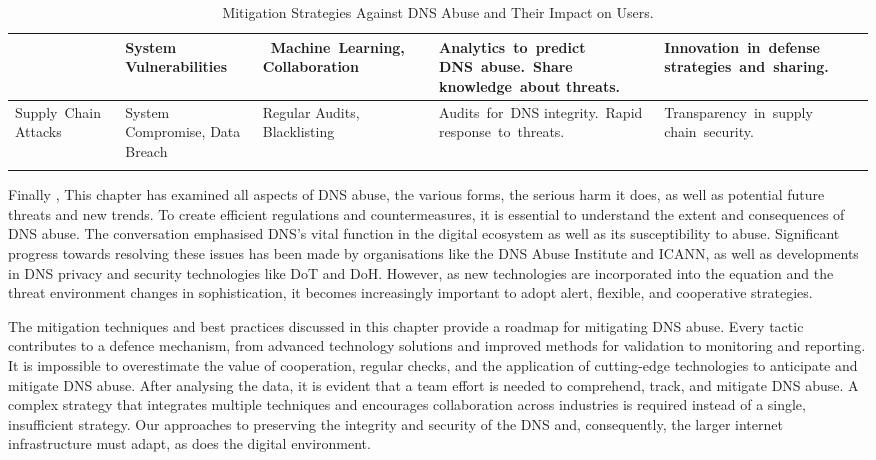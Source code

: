 {\begin{longtable}{|p{2.5cm}|p{2.5cm}|p{4cm}|p{3cm}|p{4cm}|}
{\mbox{Exploiting} Emerging \mbox{Technologies} & System \mbox{Vulnerabilities} &\mbox{ Machine Learning,} \mbox{Collaboration} & \mbox{Analytics to predict} \mbox{DNS abuse. Share} \mbox{knowledge about} \mbox{threats.} & \mbox{Innovation in defense}  \mbox{strategies and sharing.} \\ \hline

\mbox{Supply Chain} \mbox{Attacks} & \mbox{System} \mbox{Compromise,} Data Breach & Regular Audits, Blacklisting & \mbox{Audits for DNS} \mbox{integrity. Rapid} \mbox{response to threats.} & \mbox{Transparency in supply} \mbox{chain security.} \\ \hline

\caption{Mitigation Strategies Against DNS Abuse and Their Impact on Users.} 

\end{longtable}

}

Finally , This chapter has examined all aspects of DNS abuse,  the various forms, the serious harm it does, as well as potential future threats and new trends. To create efficient regulations and countermeasures, it is essential to understand the extent and consequences of DNS abuse. The conversation emphasised DNS's vital function in the digital ecosystem as well as its susceptibility to abuse. Significant progress towards resolving these issues has been made by organisations like the DNS Abuse Institute and ICANN, as well as developments in DNS privacy and security technologies like DoT and DoH. However, as new technologies are incorporated into the equation and the threat environment changes in sophistication, it becomes increasingly important to adopt alert, flexible, and cooperative strategies.  

The mitigation techniques and best practices discussed in this chapter provide a roadmap for mitigating DNS abuse. Every tactic contributes to a defence mechanism, from advanced technology solutions and improved methods for validation to monitoring and reporting. It is impossible to overestimate the value of cooperation, regular checks, and the application of cutting-edge technologies to anticipate and mitigate DNS abuse. After analysing the data, it is evident that a team effort is needed to comprehend, track, and mitigate DNS abuse. A complex strategy that integrates multiple techniques and encourages collaboration across industries is required instead of a single, insufficient strategy. Our approaches to preserving the integrity and security of the DNS and, consequently, the larger internet infrastructure must adapt, as does the digital environment.

